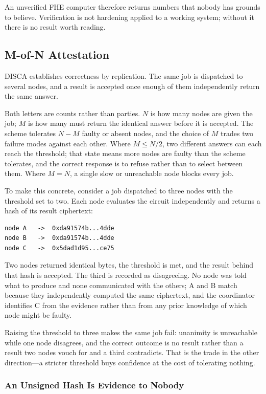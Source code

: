 \documentclass[12pt,a4paper]{article}
\begin{document}
An unverified FHE computer therefore returns numbers that nobody has grounds to believe.
Verification is not hardening applied to a working system; without it there is no result worth reading.

\subsection{M-of-N Attestation}

DISCA establishes correctness by replication.
The same job is dispatched to several nodes, and a result is accepted once enough of them independently return the same answer.

Both letters are counts rather than parties.
$N$ is how many nodes are given the job; $M$ is how many must return the identical answer before it is accepted.
The scheme tolerates $N - M$ faulty or absent nodes, and the choice of $M$ trades two failure modes against each other.
Where $M \leq N/2$, two different answers can each reach the threshold; that state means more nodes are faulty than the scheme tolerates, and the correct response is to refuse rather than to select between them.
Where $M = N$, a single slow or unreachable node blocks every job.

To make this concrete, consider a job dispatched to three nodes with the threshold set to two.
Each node evaluates the circuit independently and returns a hash of its result ciphertext:

\begin{verbatim}
node A   ->  0xda91574b...4dde
node B   ->  0xda91574b...4dde
node C   ->  0x5dad1d95...ce75
\end{verbatim}

Two nodes returned identical bytes, the threshold is met, and the result behind that hash is accepted.
The third is recorded as disagreeing.
No node was told what to produce and none communicated with the others; A and B match because they independently computed the same ciphertext, and the coordinator identifies C from the evidence rather than from any prior knowledge of which node might be faulty.

Raising the threshold to three makes the same job fail: unanimity is unreachable while one node disagrees, and the correct outcome is no result rather than a result two nodes vouch for and a third contradicts.
That is the trade in the other direction---a stricter threshold buys confidence at the cost of tolerating nothing.

\subsubsection{An Unsigned Hash Is Evidence to Nobody}
\end{document}
